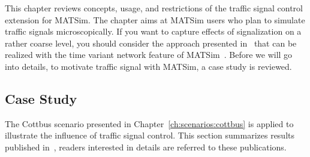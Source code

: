 This chapter reviews concepts, usage, and restrictions of the traffic signal control extension for MATSim. 
The chapter aims at MATSim users who plan to simulate traffic signals microscopically. 
If you want to capture effects of signalization on a rather coarse level, you should consider the approach presented in~\citet[pp.~139][]{Charypar2008PhD} that can be realized with the time variant network feature of MATSim~\citep{LaemmelGretherNagel2009TimeDependentNetworks}. 
Before we will go into details, to motivate traffic signal with MATSim, a case study is reviewed. 
%

\subsection{Case Study}

The Cottbus scenario presented in Chapter~\ref{ch:scenarios:cottbus} is applied to illustrate the influence of traffic signal control. 
This section summarizes results published in~\citet{GretherBischoffNagel2011CottbusSylviaEventAbstract,Grether2014PhD}, readers interested in details are referred to these publications. 

